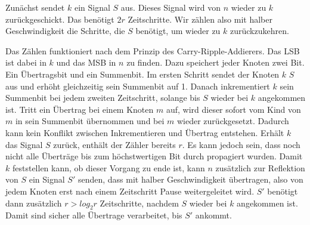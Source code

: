 \documentclass[11pt]{article}
\begin{document}
Zunächst sendet $k$ ein Signal $S$ aus. Dieses Signal wird von $n$ wieder zu $k$ zurückgeschickt. Das benötigt $2r$ Zeitschritte. Wir zählen also mit halber Geschwindigkeit die Schritte, die $S$ benötigt, um wieder zu $k$ zurückzukehren.

Das Zählen funktioniert nach dem Prinzip des Carry-Ripple-Addierers. 
Das LSB ist dabei in $k$ und das MSB in $n$ zu finden.
Dazu speichert jeder Knoten zwei Bit. Ein Übertragsbit und ein Summenbit. Im ersten Schritt sendet der Knoten $k$ $S$ aus und erhöht gleichzeitig sein Summenbit auf 1. Danach inkrementiert $k$ sein Summenbit bei jedem zweiten Zeitschritt, solange bis $S$ wieder bei $k$ angekommen ist. 
Tritt ein Übertrag bei einem Knoten $m$ auf, wird dieser sofort vom Kind von $m$ in sein Summenbit übernommen und bei $m$ wieder zurückgesetzt.
Dadurch kann kein Konflikt zwischen Inkrementieren und Übertrag entstehen.
Erhält $k$ das Signal $S$ zurück, enthält der Zähler bereits $r$. 
Es kann jedoch sein, dass noch nicht alle Überträge bis zum höchstwertigen Bit durch propagiert wurden. 
Damit $k$ feststellen kann, ob dieser Vorgang zu ende ist, kann $n$ zusätzlich zur Reflektion von $S$ ein Signal $S'$ senden, dass mit halber Geschwindigkeit übertragen, also von jedem Knoten erst nach einem Zeitschritt Pause weitergeleitet wird.
$S'$ benötigt dann zusätzlich $r > log_2 r$ Zeitschritte, nachdem $S$ wieder bei $k$ angekommen ist. 
Damit sind sicher alle Übertrage verarbeitet, bis $S'$ ankommt.
\end{document}
